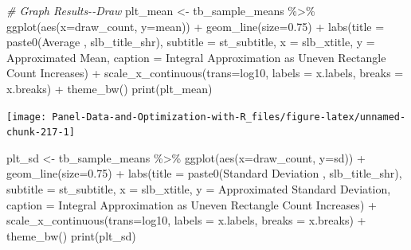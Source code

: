 \documentclass[
]{book}
\newenvironment{Shaded}{\begin{snugshade}}{\end{snugshade}}
\newcommand{\AttributeTok}[1]{\textcolor[rgb]{0.77,0.63,0.00}{#1}}
\newcommand{\CommentTok}[1]{\textcolor[rgb]{0.56,0.35,0.01}{\textit{#1}}}
\newcommand{\FloatTok}[1]{\textcolor[rgb]{0.00,0.00,0.81}{#1}}
\newcommand{\FunctionTok}[1]{\textcolor[rgb]{0.00,0.00,0.00}{#1}}
\newcommand{\NormalTok}[1]{#1}
\newcommand{\OtherTok}[1]{\textcolor[rgb]{0.56,0.35,0.01}{#1}}
\newcommand{\SpecialCharTok}[1]{\textcolor[rgb]{0.00,0.00,0.00}{#1}}
\newcommand{\StringTok}[1]{\textcolor[rgb]{0.31,0.60,0.02}{#1}}
\begin{document}
\begin{Shaded}
\begin{Highlighting}[]
\CommentTok{\# Graph Results{-}{-}Draw}
\NormalTok{plt\_mean }\OtherTok{\textless{}{-}}\NormalTok{ tb\_sample\_means }\SpecialCharTok{\%\textgreater{}\%}
  \FunctionTok{ggplot}\NormalTok{(}\FunctionTok{aes}\NormalTok{(}\AttributeTok{x=}\NormalTok{draw\_count, }\AttributeTok{y=}\NormalTok{mean)) }\SpecialCharTok{+}
  \FunctionTok{geom\_line}\NormalTok{(}\AttributeTok{size=}\FloatTok{0.75}\NormalTok{) }\SpecialCharTok{+}
  \FunctionTok{labs}\NormalTok{(}\AttributeTok{title =} \FunctionTok{paste0}\NormalTok{(}\StringTok{\textquotesingle{}Average \textquotesingle{}}\NormalTok{, slb\_title\_shr),}
       \AttributeTok{subtitle =}\NormalTok{ st\_subtitle,}
       \AttributeTok{x =}\NormalTok{ slb\_xtitle,}
       \AttributeTok{y =} \StringTok{\textquotesingle{}Approximated Mean\textquotesingle{}}\NormalTok{,}
       \AttributeTok{caption =} \StringTok{\textquotesingle{}Integral Approximation as Uneven Rectangle Count Increases\textquotesingle{}}\NormalTok{) }\SpecialCharTok{+}
  \FunctionTok{scale\_x\_continuous}\NormalTok{(}\AttributeTok{trans=}\StringTok{\textquotesingle{}log10\textquotesingle{}}\NormalTok{, }\AttributeTok{labels =}\NormalTok{ x.labels, }\AttributeTok{breaks =}\NormalTok{ x.breaks) }\SpecialCharTok{+}
  \FunctionTok{theme\_bw}\NormalTok{()}
\FunctionTok{print}\NormalTok{(plt\_mean)}
\end{Highlighting}
\end{Shaded}

\begin{center}\texttt{[image: Panel-Data-and-Optimization-with-R\_files/figure-latex/unnamed-chunk-217-1]} \end{center}

\begin{Shaded}
\begin{Highlighting}[]
\NormalTok{plt\_sd }\OtherTok{\textless{}{-}}\NormalTok{ tb\_sample\_means }\SpecialCharTok{\%\textgreater{}\%}
  \FunctionTok{ggplot}\NormalTok{(}\FunctionTok{aes}\NormalTok{(}\AttributeTok{x=}\NormalTok{draw\_count, }\AttributeTok{y=}\NormalTok{sd)) }\SpecialCharTok{+}
  \FunctionTok{geom\_line}\NormalTok{(}\AttributeTok{size=}\FloatTok{0.75}\NormalTok{) }\SpecialCharTok{+}
  \FunctionTok{labs}\NormalTok{(}\AttributeTok{title =} \FunctionTok{paste0}\NormalTok{(}\StringTok{\textquotesingle{}Standard Deviation \textquotesingle{}}\NormalTok{, slb\_title\_shr),}
       \AttributeTok{subtitle =}\NormalTok{ st\_subtitle,}
       \AttributeTok{x =}\NormalTok{ slb\_xtitle,}
       \AttributeTok{y =} \StringTok{\textquotesingle{}Approximated Standard Deviation\textquotesingle{}}\NormalTok{,}
       \AttributeTok{caption =} \StringTok{\textquotesingle{}Integral Approximation as Uneven Rectangle Count Increases\textquotesingle{}}\NormalTok{) }\SpecialCharTok{+}
  \FunctionTok{scale\_x\_continuous}\NormalTok{(}\AttributeTok{trans=}\StringTok{\textquotesingle{}log10\textquotesingle{}}\NormalTok{, }\AttributeTok{labels =}\NormalTok{ x.labels, }\AttributeTok{breaks =}\NormalTok{ x.breaks) }\SpecialCharTok{+}
  \FunctionTok{theme\_bw}\NormalTok{()}
\FunctionTok{print}\NormalTok{(plt\_sd)}
\end{Highlighting}
\end{Shaded}
\end{document}
